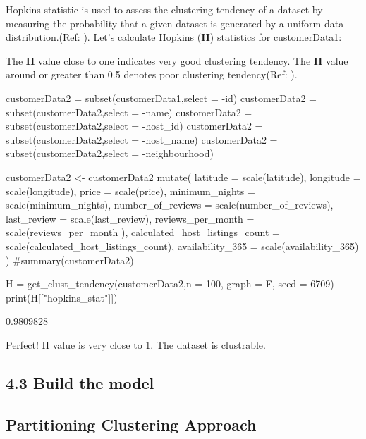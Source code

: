 Hopkins statistic is used to assess the clustering tendency of a dataset
by measuring the probability that a given dataset is generated by a
uniform data distribution.(Ref: \cite{mining}). Let's calculate Hopkins
(\textbf{H}) statistics for customerData1:

The \textbf{H} value close to one indicates very good clustering
tendency. The \textbf{H} value around or greater than 0.5 denotes poor
clustering tendency(Ref: \cite{factoextra}).

\begin{Schunk}
\begin{Sinput}
customerData2 = subset(customerData1,select = -id)
customerData2 = subset(customerData2,select = -name)
customerData2 = subset(customerData2,select = -host_id)
customerData2 = subset(customerData2,select = -host_name)
customerData2 = subset(customerData2,select = -neighbourhood)

customerData2 <- customerData2 %
mutate(
       latitude = scale(latitude),
       longitude = scale(longitude),
       price = scale(price),
       minimum_nights = scale(minimum_nights),
       number_of_reviews = scale(number_of_reviews),
       last_review = scale(last_review),
       reviews_per_month  = scale(reviews_per_month ),
       calculated_host_listings_count = scale(calculated_host_listings_count),
       availability_365 = scale(availability_365)
)
#summary(customerData2)
\end{Sinput}
\end{Schunk}

\begin{Schunk}
\begin{Sinput}
H =  get_clust_tendency(customerData2,n = 100, graph = F, seed = 6709)
print(H[["hopkins_stat"]])
\end{Sinput}
\begin{Soutput}
[1] 0.9809828
\end{Soutput}
\end{Schunk}

Perfect! H value is very close to 1. The dataset is clustrable.

\hypertarget{build-the-model-2}{%
\subsection{4.3 Build the model}\label{build-the-model-2}}

\hypertarget{partitioning-clustering-approach}{%
\subsection{Partitioning Clustering
Approach}\label{partitioning-clustering-approach}}

